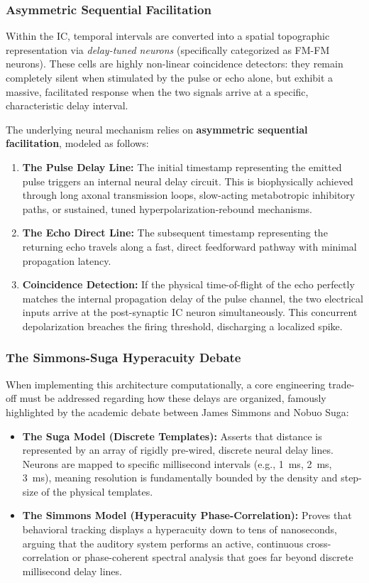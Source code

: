 \subsubsection{Asymmetric Sequential Facilitation}
Within the IC, temporal intervals are converted into a spatial topographic representation via \textit{delay-tuned neurons} (specifically categorized as FM-FM neurons). These cells are highly non-linear coincidence detectors: they remain completely silent when stimulated by the pulse or echo alone, but exhibit a massive, facilitated response when the two signals arrive at a specific, characteristic delay interval.

The underlying neural mechanism relies on \textbf{asymmetric sequential facilitation}, modeled as follows:
\begin{enumerate}
    \item \textbf{The Pulse Delay Line:} The initial timestamp representing the emitted pulse triggers an internal neural delay circuit. This is biophysically achieved through long axonal transmission loops, slow-acting metabotropic inhibitory paths, or sustained, tuned hyperpolarization-rebound mechanisms.
    \item \textbf{The Echo Direct Line:} The subsequent timestamp representing the returning echo travels along a fast, direct feedforward pathway with minimal propagation latency.
    \item \textbf{Coincidence Detection:} If the physical time-of-flight of the echo perfectly matches the internal propagation delay of the pulse channel, the two electrical inputs arrive at the post-synaptic IC neuron simultaneously. This concurrent depolarization breaches the firing threshold, discharging a localized spike.
\end{enumerate}

\subsubsection{The Simmons-Suga Hyperacuity Debate}
When implementing this architecture computationally, a core engineering trade-off must be addressed regarding how these delays are organized, famously highlighted by the academic debate between James Simmons and Nobuo Suga:
\begin{itemize}
    \item \textbf{The Suga Model (Discrete Templates):} Asserts that distance is represented by an array of rigidly pre-wired, discrete neural delay lines. Neurons are mapped to specific millisecond intervals (e.g., 1~ms, 2~ms, 3~ms), meaning resolution is fundamentally bounded by the density and step-size of the physical templates.
    \item \textbf{The Simmons Model (Hyperacuity Phase-Correlation):} Proves that behavioral tracking displays a hyperacuity down to tens of nanoseconds, arguing that the auditory system performs an active, continuous cross-correlation or phase-coherent spectral analysis that goes far beyond discrete millisecond delay lines.
\end{itemize}
